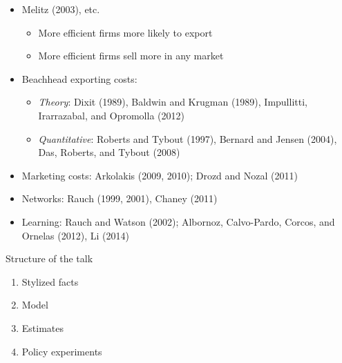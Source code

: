 \documentclass[notes=show]{beamer}
\begin{document}
\begin{frame}%


\begin{itemize}
\item Melitz (2003), etc.

\begin{itemize}
\item More efficient firms more likely to export

\item More efficient firms sell more in any market
\end{itemize}

\item Beachhead exporting costs:

\begin{itemize}
\item \textit{Theory}: Dixit (1989), Baldwin and Krugman (1989), Impullitti,
Irarrazabal, and Opromolla (2012)

\item \textit{Quantitative}: Roberts and Tybout (1997), Bernard and Jensen
(2004), Das, Roberts, and Tybout (2008)
\end{itemize}

\item Marketing costs: Arkolakis (2009, 2010); Drozd and Nozal (2011)

\item Networks: Rauch (1999, 2001), Chaney (2011)

\item Learning: Rauch and Watson (2002); Albornoz, Calvo-Pardo, Corcos, and
Ornelas (2012), Li (2014)
\end{itemize}

\end{frame}%

\begin{frame}{Structure of the talk}

    \begin{enumerate}
        \item Stylized facts
        \item Model
        \item Estimates
        \item Policy experiments
    \end{enumerate}

\end{frame}
\end{document}

